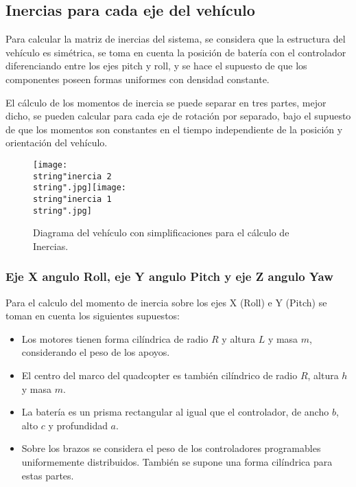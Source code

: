 \documentclass[../main.tex]{subfiles}
\begin{document}
\subsection{Inercias para cada eje del vehículo}

Para calcular la matriz de inercias del sistema, se considera que
la estructura del vehículo es simétrica, se toma en cuenta la posición
de batería con el controlador diferenciando entre los ejes pitch y
roll, y se hace el supuesto de que los componentes poseen formas uniformes
con densidad constante.

El cálculo de los momentos de inercia se puede separar en tres partes,
mejor dicho, se pueden calcular para cada eje de rotación por separado,
bajo el supuesto de que los momentos son constantes en el tiempo independiente
de la posición y orientación del vehículo.

\begin{figure}[H]
\noindent \begin{centering}
\texttt{[image: \\string"inercia 2\\string".jpg]}\texttt{[image: \\string"inercia 1\\string".jpg]}
\par\end{centering}
\caption{Diagrama del vehículo con simplificaciones para el cálculo de Inercias.}
\end{figure}

\subsubsection{Eje X angulo Roll, eje Y angulo Pitch y eje Z angulo Yaw}

Para el calculo del momento de inercia sobre los ejes X (Roll) e Y
(Pitch) se toman en cuenta los siguientes supuestos:
\begin{itemize}
\item Los motores tienen forma cilíndrica de radio $R$ y altura $L$ y
masa $m$, considerando el peso de los apoyos.
\item El centro del marco del quadcopter es también cilíndrico de radio
$R$, altura $h$ y masa $m$.
\item La batería es un prisma rectangular al igual que el controlador, de
ancho $b$, alto $c$ y profundidad $a$. 
\item Sobre los brazos se considera el peso de los controladores programables
uniformemente distribuidos. También se supone una forma cilíndrica
para estas partes.
\end{itemize}
\end{document}
